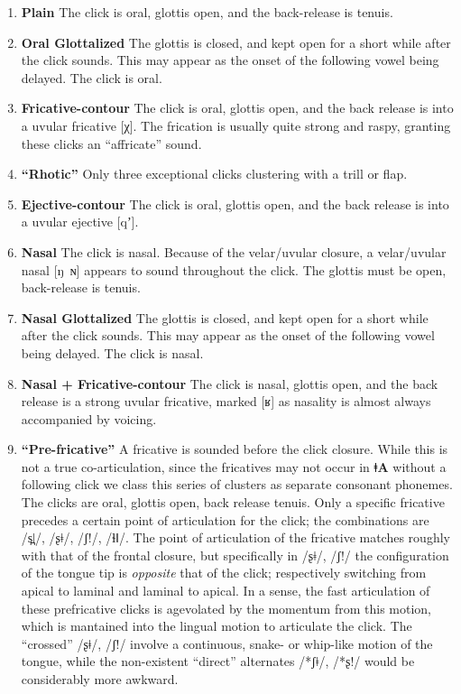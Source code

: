 \documentclass[11pt,a5paper]{book}
\newcommand{\qcn}[1]{\textcolor{AccentText}{\large\textbf{#1}}}
\newcommand{\langname}{\qcn{ǂA}}
\begin{document}
\begin{enumerate}[I]
\item \textbf{Plain} The click is oral, glottis open, and the back-release is tenuis.
\item \textbf{Oral Glottalized} The glottis is closed, and kept open for a short while after the click sounds. This may appear as the onset of the following vowel being delayed. The click is oral.
\item \textbf{Fricative-contour} The click is oral, glottis open, and the back release is into a uvular fricative [χ]. The frication is usually quite strong and raspy, granting these clicks an ``affricate'' sound.
\item \textbf{``Rhotic''} Only three exceptional clicks clustering with a trill or flap.
\item \textbf{Ejective-contour} The click is oral, glottis open, and the back release is into a uvular ejective [qʼ].
\item \textbf{Nasal} The click is nasal. Because of the velar/uvular closure, a velar/uvular nasal [ŋ~ɴ] appears to sound throughout the click. The glottis must be open, back-release is tenuis.
\item \textbf{Nasal Glottalized} The glottis is closed, and kept open for a short while after the click sounds. This may appear as the onset of the following vowel being delayed. The click is nasal.
\item \textbf{Nasal + Fricative-contour} The click is nasal, glottis open, and the back release is a strong uvular fricative, marked [ʁ] as nasality is almost always accompanied by voicing.
\item \textbf{``Pre-fricative''} A fricative is sounded before the click closure. While this is not a true co-articulation, since the fricatives may not occur in \langname{} without a following click we class this series of clusters as separate consonant phonemes. The clicks are oral, glottis open, back release tenuis. Only a specific fricative precedes a certain point of articulation for the click; the combinations are /s̪ǀ/, /ʂǂ/, /ʃ!/, /ɬǁ/. The point of articulation of the fricative matches roughly with that of the frontal closure, but specifically in /ʂǂ/, /ʃ!/ the configuration of the tongue tip is \emph{opposite} that of the click; respectively switching from apical to laminal and laminal to apical. In a sense, the fast articulation of these prefricative clicks is agevolated by the momentum from this motion, which is mantained into the lingual motion to articulate the click. The ``crossed'' /ʂǂ/, /ʃ!/ involve a continuous, snake- or whip-like motion of the tongue, while the non-existent ``direct'' alternates /*ʃǂ/, /*ʂ!/ would be considerably more awkward.

\end{enumerate}
\end{document}
